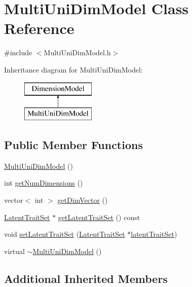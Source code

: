 \hypertarget{classMultiUniDimModel}{}\section{Multi\+Uni\+Dim\+Model Class Reference}
\label{classMultiUniDimModel}


{\ttfamily \#include $<$Multi\+Uni\+Dim\+Model.\+h$>$}

Inheritance diagram for Multi\+Uni\+Dim\+Model\+:\begin{figure}[H]
\begin{center}
\leavevmode
\includegraphics[height=2.000000cm]{classMultiUniDimModel}
\end{center}
\end{figure}
\subsection*{Public Member Functions}
\begin{DoxyCompactItemize}
\item 
\hyperlink{classMultiUniDimModel_a9c267d062e0d311ab39f27144827de05}{Multi\+Uni\+Dim\+Model} ()
\item 
int \hyperlink{classMultiUniDimModel_a6789b80610d6db4985dc51020313b158}{get\+Num\+Dimensions} ()
\item 
vector$<$ int $>$ \hyperlink{classMultiUniDimModel_a1e92f67a87f5b406f0382e9cb240f889}{get\+Dim\+Vector} ()
\item 
\hyperlink{classLatentTraitSet}{Latent\+Trait\+Set} $\ast$ \hyperlink{classMultiUniDimModel_aa3b9917e93a9498f5eb95c74a2335797}{get\+Latent\+Trait\+Set} () const 
\item 
void \hyperlink{classMultiUniDimModel_ac13d9476e8687888d1a290704561e704}{set\+Latent\+Trait\+Set} (\hyperlink{classLatentTraitSet}{Latent\+Trait\+Set} $\ast$\hyperlink{classDimensionModel_af202cd5a44ee99d865674c6e26d770c8}{latent\+Trait\+Set})
\item 
virtual \hyperlink{classMultiUniDimModel_ab0299e7f4747366d8ef47d3015970cd2}{$\sim$\+Multi\+Uni\+Dim\+Model} ()
\end{DoxyCompactItemize}
\subsection*{Additional Inherited Members}


